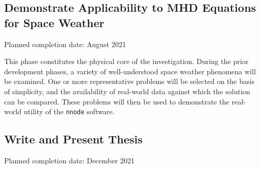 \documentclass{article}
\begin{document}
\subsection{Demonstrate Applicability to MHD Equations for Space Weather}

Planned completion date: August 2021

This phase constitutes the physical core of the investigation. During the prior development phases, a variety of well-understood space weather phenomena will be examined. One or more representative problems will be selected on the basis of simplicity, and the availability of real-world data against which the solution can be compared. These problems will then be used to demonstrate the real-world utility of the \texttt{nnode} software.

\subsection{Write and Present Thesis}

Planned completion date: December 2021


\medskip

\printbibliography[heading=bibintoc]

\end{document}
